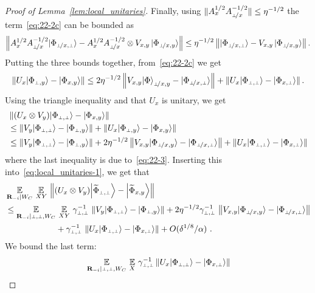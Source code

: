 \begin{proof}[Proof of Lemma~\ref{lem:local_unitaries}]
Finally, using $\|A_x^{1/2} A_\dummyx^{-1/2}\|\leq \eta^{-1/2}$ the term~\eqref{eq:22-2c} can be bounded as
$$
\left \| A_x^{1/2} A_\dummyx^{-1/2} \ket{\Phi_{\dummyx,\dummy}} - A_x^{1/2} A_\dummyx^{-1/2}  \otimes V_{x,y}\, \ket{\Phi_{\dummyx,y}} \right \| \leq \eta^{-1/2} \left \|  \ket{\Phi_{\dummyx,\dummy}} - V_{x,y}\, \ket{\Phi_{\dummyx,y}} \right \|.
$$
Putting the three bounds together, from~\eqref{eq:22-2c} we get
\begin{align}
\left \| U_x \ket{\Phi_{\dummy,y}} - \ket{\Phi_{x,y}} \right \| \leq   2 \eta^{-1/2} \left \|  V_{x,y} \ket{\Phi}_{\dummyx,y} - \ket{{\Phi}_{\dummyx,\dummy}} \right \| + \left \|  U_x \ket{{\Phi}_{\dummy,\dummy}} -  \ket{{\Phi}_{x,\dummy}} \right \| .\label{eq:22-3}
\end{align}
Using the triangle inequality and that $U_x$ is unitary, we get
\begin{align*}
&\left \| (U_x \otimes V_y) \ket{{\Phi}_{\dummy,\dummy}} - \ket{{\Phi}_{x,y}} \right\| \\
&\leq  \left \| V_y \ket{{\Phi}_{\dummy,\dummy}} - \ket{{\Phi}_{\dummy,y}} \right \| + \left \| U_x \ket{{\Phi}_{\dummy,y}} - \ket{{\Phi}_{x,y}} \right \| \notag\\ 
&\leq  \left \| V_y \ket{{\Phi}_{\dummy,\dummy}} - \ket{{\Phi}_{\dummy,y}} \right \|  + 2\eta^{-1/2} \left \|  V_{x,y} \ket{\Phi_{\dummyx,y}} - \ket{{\Phi}_{\dummyx,\dummy}} \right \| +  \left \|  U_x \ket{{\Phi}_{\dummy,\dummy}} -  \ket{{\Phi}_{x,\dummy}} \right \|
\end{align*}
where the last inequality is due to~\eqref{eq:22-3}. Inserting this into~\eqref{eq:local_unitaries-1}, we get that
\begin{align*}
&\Ex_{\bR_\mi | W_C} \, \Ex_{XY} \, \left \| (U_{x} \otimes V_{y}) \bigket{\wt{\Phi}_{\pp}} - \bigket{\wt{\Phi}_{\xy}} \right\| \\
&\leq \Ex_{\bR_\mi | \dummy, \dummy, W_C} \, \Ex_{XY} \, \gamma_\pp^{-1} \, \left \| V_y \ket{{\Phi}_{\dummy,\dummy}} - \ket{{\Phi}_{\dummy,y}} \right \|  + 2\eta^{-1/2} \gamma_\pp^{-1} \,\left \|  V_{x,y} \ket{\Phi_{\dummyx,y}} - \ket{{\Phi}_{\dummyx,\dummy}} \right \| \\
& \qquad \qquad \qquad + \gamma_\pp^{-1} \, \left \|  U_x \ket{{\Phi}_{\dummy,\dummy}} -  \ket{{\Phi}_{x,\dummy}} \right \| + O(\delta^{1/8}/\alpha)~.
\end{align*}
We bound the last term:
\begin{align*}
	&\Ex_{\bR_\mi | \dummy, \dummy, W_C} \, \Ex_X \, \gamma_\pp^{-1} \left \|  U_x \ket{{\Phi}_{\dummy,\dummy}} -  \ket{{\Phi}_{x,\dummy}} \right \| \\

\end{align*}
\end{proof}
